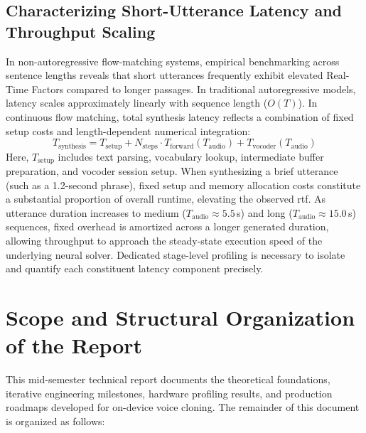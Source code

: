 \subsection{Characterizing Short-Utterance Latency and Throughput Scaling}
In non-autoregressive flow-matching systems, empirical benchmarking across sentence lengths reveals that short utterances frequently exhibit elevated Real-Time Factors compared to longer passages. In traditional autoregressive models, latency scales approximately linearly with sequence length ($O(T)$). In continuous flow matching, total synthesis latency reflects a combination of fixed setup costs and length-dependent numerical integration:
\begin{equation}
    T_{\text{synthesis}} = T_{\text{setup}} + N_{\text{steps}} \cdot T_{\text{forward}}(T_{\text{audio}}) + T_{\text{vocoder}}(T_{\text{audio}})
    \label{eq:latency_decomposition}
\end{equation}
Here, $T_{\text{setup}}$ includes text parsing, vocabulary lookup, intermediate buffer preparation, and vocoder session setup. When synthesizing a brief utterance (such as a 1.2-second phrase), fixed setup and memory allocation costs constitute a substantial proportion of overall runtime, elevating the observed \acrshort{rtf}. As utterance duration increases to medium ($T_{\text{audio}} \approx 5.5$\,s) and long ($T_{\text{audio}} \approx 15.0$\,s) sequences, fixed overhead is amortized across a longer generated duration, allowing throughput to approach the steady-state execution speed of the underlying neural solver. Dedicated stage-level profiling is necessary to isolate and quantify each constituent latency component precisely.

\section{Scope and Structural Organization of the Report}
This mid-semester technical report documents the theoretical foundations, iterative engineering milestones, hardware profiling results, and production roadmaps developed for on-device voice cloning. The remainder of this document is organized as follows:

